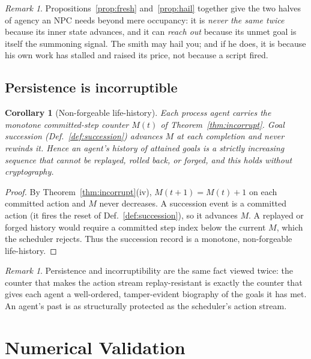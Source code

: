 \documentclass[11pt,twocolumn,a4paper]{article}
\theoremstyle{plain}
\newtheorem{corollary}[theorem]{Corollary}
\theoremstyle{definition}
\theoremstyle{remark}
\newtheorem{remark}[theorem]{Remark}
\begin{document}
\begin{remark}
Propositions~\ref{prop:fresh} and~\ref{prop:hail} together give the two halves of
agency an NPC needs beyond mere occupancy: it is \emph{never the same twice}
because its inner state advances, and it can \emph{reach out} because its unmet
goal is itself the summoning signal. The smith may hail you; and if he does, it is
because his own work has stalled and raised its price, not because a script fired.
\end{remark}

\subsection{Persistence is incorruptible}

\begin{corollary}[Non-forgeable life-history]
\label{cor:lifehistory}
Each process agent carries the monotone committed-step counter $M(t)$ of
Theorem~\ref{thm:incorrupt}. Goal succession (Def.~\ref{def:succession}) advances
$M$ at each completion and never rewinds it. Hence an agent's history of attained
goals is a strictly increasing sequence that cannot be replayed, rolled back, or
forged, and this holds without cryptography.
\end{corollary}

\begin{proof}
By Theorem~\ref{thm:incorrupt}(iv), $M(t+1) = M(t) + 1$ on each committed action and
$M$ never decreases. A succession event is a committed action (it fires the reset of
Def.~\ref{def:succession}), so it advances $M$. A replayed or forged history would
require a committed step index below the current $M$, which the scheduler rejects.
Thus the succession record is a monotone, non-forgeable life-history.
\end{proof}

\begin{remark}
Persistence and incorruptibility are the same fact viewed twice: the counter that
makes the action stream replay-resistant is exactly the counter that gives each
agent a well-ordered, tamper-evident biography of the goals it has met. An agent's
past is as structurally protected as the scheduler's action stream.
\end{remark}

\section{Numerical Validation}
\label{sec:validation}
\end{document}
